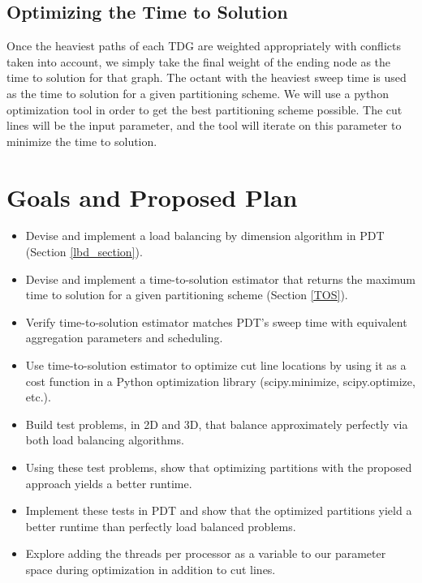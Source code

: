 \documentclass[11pt, letterpaper,titlepage,oneside]{article}
\begin{document}
\subsection{Optimizing the Time to Solution}\label{optimize}

Once the heaviest paths of each TDG are weighted appropriately with conflicts taken into account, we simply take the final weight of the ending node as the time to solution for that graph. The octant with the heaviest sweep time is used as the time to solution for a given partitioning scheme. We will use a python optimization tool in order to get the best partitioning scheme possible. The cut lines will be the input parameter, and the tool will iterate on this parameter to minimize the time to solution. 

\section{Goals and Proposed Plan}

\begin{itemize}
\item Devise and implement a load balancing by dimension algorithm in PDT (Section \ref{lbd_section}).
\item Devise and implement a time-to-solution estimator that returns the maximum time to solution for a given partitioning scheme (Section \ref{TOS}).
\item Verify time-to-solution estimator matches PDT's sweep time with equivalent aggregation parameters and scheduling.
\item Use time-to-solution estimator to optimize cut line locations by using it as a cost function in a Python optimization library (scipy.minimize, scipy.optimize, etc.). 
\item Build test problems, in 2D and 3D, that balance approximately perfectly via both load balancing algorithms.
\item Using these test problems, show that optimizing partitions with the proposed approach yields a better runtime.
\item Implement these tests in PDT and show that the optimized partitions yield a better runtime than perfectly load balanced problems.
\item Explore adding the threads per processor as a variable to our parameter space during optimization in addition to cut lines.
\end{itemize}




\end{document}
